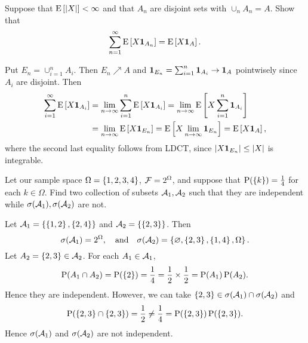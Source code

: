 \documentclass[a4paper, 12pt]{article}
\begin{document}
\begin{exercise}{2.4}
    Suppose that $\operatorname{E}\left[ {\left\lvert {X} \right\rvert} \right]<\infty$ and that $A_n$ are disjoint sets with 
    $\cup_n A_n = A$. Show that 
    \begin{equation*}
        \sum_{n=1}^\infty \operatorname{E}\left[ {X\mathbf{1}_{A_n}} \right] = \operatorname{E}\left[ {X\mathbf{1}_A} \right]. 
    \end{equation*}
\end{exercise}
\begin{solution}
    Put $E_n = \cup_{i=1}^nA_i$. Then $E_n\nearrow A$ and $\mathbf{1}_{E_n} = \sum_{i=1}^n\mathbf{1}_{A_i} 
    \to \mathbf{1}_A$ pointwisely since $A_i$ are disjoint. Then 
    \begin{equation*}
        \begin{split}
            \sum_{i=1}^\infty\operatorname{E}\left[ {X\mathbf{1}_{A_i}} \right] 
            &= \lim_{n\to\infty}\sum_{i=1}^n\operatorname{E}\left[ {X\mathbf{1}_{A_i}} \right] 
            = \lim_{n\to\infty}\operatorname{E}\left[ {X\sum_{i=1}^n\mathbf{1}_{A_i}} \right] \\
            &= \lim_{n\to\infty}\operatorname{E}\left[ {X\mathbf{1}_{E_n}} \right] = \operatorname{E}\left[ {X\lim_{n\to\infty}\mathbf{1}_{E_n}} \right] 
            = \operatorname{E}\left[ {X\mathbf{1}_A} \right],  
        \end{split}
    \end{equation*}
    where the second last equality follows from LDCT, since $\left\lvert {X\mathbf{1}_{E_n}} \right\rvert\leq\left\lvert {X} \right\rvert$ is integrable. 
\end{solution}

\begin{exercise}{2.5}
    Let our sample space $\Omega = \left\{ {1,2,3,4} \right\}$, $\mathcal{F} = 2^\Omega$, and suppose that 
    $\operatorname{P}(\left\{ {k} \right\}) = \frac{1}{4}$ for each $k\in\Omega$. Find two collection of subsets 
    $\mathcal{A}_1, \mathcal{A}_2$ such that they are independent while $\sigma(\mathcal{A}_1), \sigma(\mathcal{A}_2)$ are not. 
\end{exercise}
\begin{solution}
    Let $\mathcal{A}_1 = \left\{ {\left\{ {1,2} \right\},\left\{ {2,4} \right\}} \right\}$ and $\mathcal{A}_2 = \left\{ {\left\{ {2,3} \right\}} \right\}$. Then
    \begin{equation*}
        \sigma(\mathcal{A}_1) = 2^\Omega, \quad\text{and}\quad 
        \sigma(\mathcal{A}_2) = \left\{ {\varnothing, \left\{ {2,3} \right\}, \left\{ {1,4} \right\}, \Omega} \right\}. 
    \end{equation*} 
    Let $A_2 = \left\{ {2,3} \right\}\in\mathcal{A}_2$. For each $A_1\in\mathcal{A}_1$, 
    \begin{equation*}
        \operatorname{P}(A_1\cap A_2) = \operatorname{P}(\left\{ {2} \right\}) = \frac{1}{4} = \frac{1}{2}\times\frac{1}{2} 
        = \operatorname{P}(A_1)\operatorname{P}(A_2). 
    \end{equation*}
    Hence they are independent. However, we can take $\left\{ {2,3} \right\}\in\sigma(\mathcal{A}_1)\cap\sigma(\mathcal{A}_2)$ 
    and 
    \begin{equation*}
        \operatorname{P}(\left\{ {2,3} \right\}\cap\left\{ {2,3} \right\}) = \frac{1}{2} \neq \frac{1}{4} = \operatorname{P}(\left\{ {2,3} \right\})\operatorname{P}(\left\{ {2,3} \right\}).
    \end{equation*}
    Hence $\sigma(\mathcal{A}_1)$ and $\sigma(\mathcal{A}_2)$ are not independent. 
\end{solution}
\end{document}
